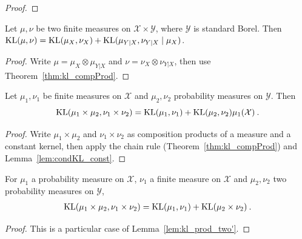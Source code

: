 \begin{proof}%
{}

\end{proof}


\begin{theorem}
  \label{thm:kl_fst_add_condKL}
  \leanok
  Let $\mu, \nu$ be two finite measures on $\mathcal X \times \mathcal Y$, where $\mathcal Y$ is standard Borel.
  Then $\operatorname{KL}(\mu, \nu) = \operatorname{KL}(\mu_X, \nu_X) + \operatorname{KL}(\mu_{Y|X}, \nu_{Y|X} \mid \mu_X)$.
\end{theorem}

\begin{proof} \leanok
{}
Write $\mu = \mu_X \otimes \mu_{Y|X}$ and $\nu = \nu_X \otimes \nu_{Y|X}$, then use Theorem~\ref{thm:kl_compProd}.
\end{proof}


\begin{lemma}
  \label{lem:kl_prod_two'}
  \leanok
  Let $\mu_1, \nu_1$ be finite measures on $\mathcal X$ and $\mu_2, \nu_2$ probability measures on $\mathcal{Y}$. Then
  $$\operatorname{KL}(\mu_1\times \mu_2, \nu_1 \times \nu_2) = \operatorname{KL}(\mu_1, \nu_1) + \operatorname{KL}(\mu_2, \nu_2) \mu_1 (\mathcal X) \: .$$
\end{lemma}

\begin{proof} \leanok
{}
Write $\mu_1 \times \mu_2$ and $\nu_1 \times \nu_2$ as composition products of a measure and a constant kernel, then apply the chain rule (Theorem~\ref{thm:kl_compProd}) and Lemma~\ref{lem:condKL_const}.
\end{proof}
 

\begin{theorem}[Tensorization]
  \label{thm:kl_prod_two}
  \leanok
  For $\mu_1$ a probability measure on $\mathcal X$, $\nu_1$ a finite measure on $\mathcal{X}$ and $\mu_2, \nu_2$ two probability measures on $\mathcal Y$,
  \begin{align*}
  \operatorname{KL}(\mu_1 \times \mu_2, \nu_1 \times \nu_2) = \operatorname{KL}(\mu_1, \nu_1) + \operatorname{KL}(\mu_2 \times \nu_2) \: .
  \end{align*}
\end{theorem}

\begin{proof} \leanok
{}
This is a particular case of Lemma~\ref{lem:kl_prod_two'}.
\end{proof}


